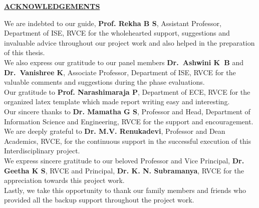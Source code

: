 
\thispagestyle{empty}

\begin{center}
    \Large\textbf{\underline{ACKNOWLEDGEMENTS}} \par
\end{center}

\noindent 
We are indebted to our guide, \textbf{Prof. Rekha B S}, Assistant Professor, Department of ISE, RVCE for the wholehearted support, suggestions and invaluable advice throughout our project work and also helped in the preparation of this thesis.\\

We also express our gratitude to our panel members 
\textbf{Dr.\ Ashwini K~B} and 
\textbf{Dr.\ Vanishree K}, Associate Professor, 
Department of ISE, RVCE for the valuable comments and 
suggestions during the phase evaluations.\\



\noindent 
Our gratitude to \textbf{Prof. Narashimaraja P}, Department of ECE, RVCE for the organized latex template which made report writing easy and interesting.\\

\noindent 
Our sincere thanks to \textbf{Dr. Mamatha G S}, Professor and Head, Department of Information Science and Engineering, RVCE for the support and encouragement.\\

\noindent 
We are deeply grateful to \textbf{Dr. M.V. Renukadevi}, Professor and Dean Academics, RVCE, for the continuous support in the successful execution of this Interdisciplinary project.\\

\noindent 
We express sincere gratitude to our beloved Professor and Vice Principal, \textbf{Dr. Geetha K S}, RVCE and Principal, \textbf{Dr. K. N. Subramanya}, RVCE for the appreciation towards this project work.\\

\noindent 
Lastly, we take this opportunity to thank our family members and friends who provided all the backup support throughout the project work.
